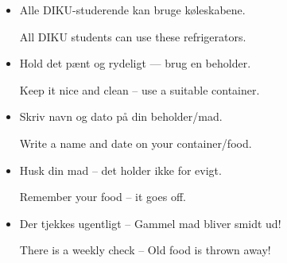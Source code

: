 \documentclass{article}
\begin{document}
\maketitle

\null
\vspace{-1cm}


\huge

\dansk

\begin{itemize}

\item Alle DIKU-studerende kan bruge køleskabene.

\english All DIKU students can use these refrigerators.

\dansk \item Hold det pænt og rydeligt --- brug en beholder.

\english Keep it nice and clean -- use a suitable container.

\dansk \item Skriv navn og dato på din beholder/mad.

\english Write a name and date on your container/food.

\dansk \item Husk din mad -- det holder ikke for evigt.

\english Remember your food -- it goes off.

\dansk \item Der tjekkes ugentligt -- Gammel mad bliver smidt ud!

\english There is a weekly check -- Old food is thrown away!
\end{itemize}

\vspace{0.5cm}

\underskriv
\end{document}
